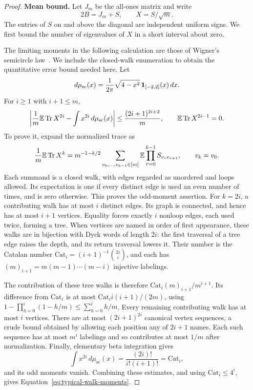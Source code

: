 \begin{proof}
\textbf{Mean bound.}
Let \(J_m\) be the all-ones matrix and write
\[
 2B=J_m+S,\qquad X=S/\sqrt m.
\]
The entries of \(S\) on and above the diagonal are independent uniform
signs. We first bound the number of eigenvalues of \(X\) in a short
interval about zero.

The limiting moments in the following calculation are those of
Wigner's semicircle law~\cite{Wigner}. We include the closed-walk
enumeration to obtain the quantitative error bound needed here. Let
\[
 d\mu_{\mathrm{sc}}(x)=\frac{1}{2\pi}\sqrt{4-x^2}\,
             \mathbf 1_{[-2,2]}(x)\,dx.
\]
For \(i\ge1\) with \(i+1\le m\),
\begin{equation}\label{eq:typical-walk-moments}
 \left|\frac1m\mathbb E\operatorname{Tr} X^{2i}
       -\int x^{2i}\,d\mu_{\mathrm{sc}}(x)\right|
 \le \frac{(2i+1)^{2i+2}}{m},
 \qquad
 \mathbb E\operatorname{Tr} X^{2i-1}=0.
\end{equation}
To prove it, expand the normalized trace as
\[
 \frac1m\mathbb E\operatorname{Tr} X^k
 =m^{-1-k/2}\sum_{v_0,\ldots,v_{k-1}\in[m]}
       \mathbb E\prod_{r=0}^{k-1}S_{v_rv_{r+1}},
 \qquad v_k=v_0.
\]
Each summand is a closed walk, with edges regarded as unordered and
loops allowed. Its expectation is one if every distinct edge is used
an even number of times, and is zero otherwise. This proves the
odd-moment assertion. For \(k=2i\), a contributing walk has at most
\(i\) distinct edges. Its graph is connected, and hence has at most
\(i+1\) vertices. Equality forces exactly \(i\) nonloop edges,
each used twice, forming a tree. When vertices are named in order of
first appearance, these walks are in bijection with Dyck words of
length \(2i\): the first traversal of a tree edge raises the depth,
and its return traversal lowers it. Their number is the Catalan number
\(\mathrm{Cat}_i=(i+1)^{-1}\binom{2i}{i}\), and each has
\((m)_{i+1}=m(m-1)\cdots(m-i)\) injective labelings.

The contribution of these tree walks is therefore
\(\mathrm{Cat}_i(m)_{i+1}/m^{i+1}\). Its difference from
\(\mathrm{Cat}_i\) is at most
\(\mathrm{Cat}_i i(i+1)/(2m)\), using
\(1-\prod_{h=0}^i(1-h/m)\le\sum_{h=0}^i h/m\).
Every remaining contributing walk has at most \(i\) vertices.
There are at most \((2i+1)^{2i}\) canonical vertex sequences, a
crude bound obtained by allowing each position any of \(2i+1\)
names. Each such sequence has at most \(m^i\) labelings and so
contributes at most \(1/m\) after normalization. Finally, elementary
beta integration gives
\[
 \int x^{2i}\,d\mu_{\mathrm{sc}}(x)
  =\frac{(2i)!}{i!(i+1)!}=\mathrm{Cat}_i,
\]
and its odd moments vanish. Combining these estimates, and using
\(\mathrm{Cat}_i\le4^i\), gives
Equation~\eqref{eq:typical-walk-moments}.


\end{proof}
